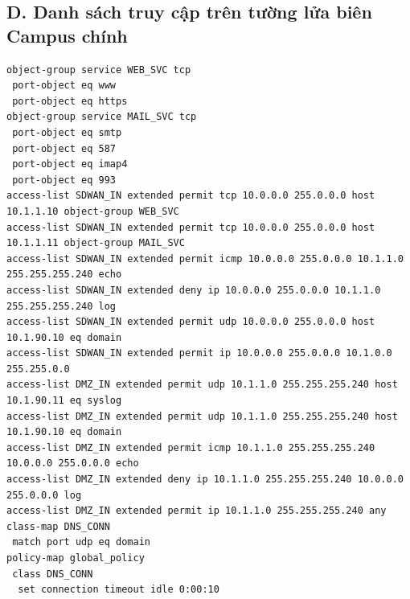 \subsection*{D. Danh sách truy cập trên tường lửa biên Campus chính}

\begin{lstlisting}[style=customcode, caption={ACL SDWAN\_IN và DMZ\_IN}]
object-group service WEB_SVC tcp
 port-object eq www
 port-object eq https
object-group service MAIL_SVC tcp
 port-object eq smtp
 port-object eq 587
 port-object eq imap4
 port-object eq 993
access-list SDWAN_IN extended permit tcp 10.0.0.0 255.0.0.0 host 10.1.1.10 object-group WEB_SVC
access-list SDWAN_IN extended permit tcp 10.0.0.0 255.0.0.0 host 10.1.1.11 object-group MAIL_SVC
access-list SDWAN_IN extended permit icmp 10.0.0.0 255.0.0.0 10.1.1.0 255.255.255.240 echo
access-list SDWAN_IN extended deny ip 10.0.0.0 255.0.0.0 10.1.1.0 255.255.255.240 log
access-list SDWAN_IN extended permit udp 10.0.0.0 255.0.0.0 host 10.1.90.10 eq domain
access-list SDWAN_IN extended permit ip 10.0.0.0 255.0.0.0 10.1.0.0 255.255.0.0
access-list DMZ_IN extended permit udp 10.1.1.0 255.255.255.240 host 10.1.90.11 eq syslog
access-list DMZ_IN extended permit udp 10.1.1.0 255.255.255.240 host 10.1.90.10 eq domain
access-list DMZ_IN extended permit icmp 10.1.1.0 255.255.255.240 10.0.0.0 255.0.0.0 echo
access-list DMZ_IN extended deny ip 10.1.1.0 255.255.255.240 10.0.0.0 255.0.0.0 log
access-list DMZ_IN extended permit ip 10.1.1.0 255.255.255.240 any
class-map DNS_CONN
 match port udp eq domain
policy-map global_policy
 class DNS_CONN
  set connection timeout idle 0:00:10
\end{lstlisting}
